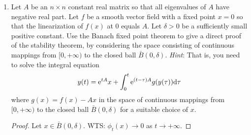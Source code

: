 \documentclass[../psets.tex]{subfiles}
\begin{document}
\begin{enumerate}
\begin{proof}
\begin{align*}
            &= \int_0^\infty 2|\e[\tau A](x_0-x_0)|\cdot\e[\tau A]\dd\tau\\
            &= \nabla L(x)\cdot f(x)\\
            &< 0
        \end{align*}
        The level sets will look like $n$-dimensional ellipsoids.
    \end{proof}
    \item Let $A$ be an $n\times n$ constant real matrix so that all eigenvalues of $A$ have negative real part. Let $f$ be a smooth vector field with a fixed point $x=0$ so that the linearization of $f(x)$ at 0 equals $A$. Let $\delta>0$ be a sufficiently small positive constant. Use the Banach fixed point theorem to give a direct proof of the stability theorem, by considering the space consisting of continuous mappings from $[0,+\infty)$ to the closed ball $\bar{B}(0,\delta)$. \emph{Hint}: That is, you need to solve the integral equation
    \begin{equation*}
        y(t) = \e[tA]x+\int_0^t\e[(t-\tau)A]g(y(\tau))\dd\tau
    \end{equation*}
    where $g(x)=f(x)-Ax$ in the space of continuous mappings from $[0,+\infty)$ to the closed ball $\bar{B}(0,\delta)$ for a suitable choice of $x$.
    \begin{proof}
        Let $x\in\bar{B}(0,\delta)$. WTS: $\phi_t(x)\to 0$ as $t\to+\infty$.
    \end{proof}
\end{enumerate}
\end{document}
